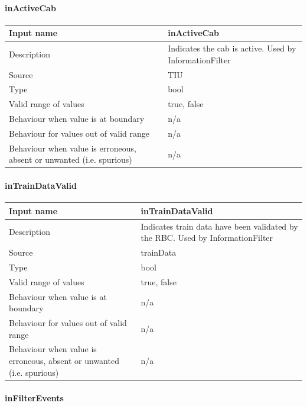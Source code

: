 \paragraph{inActiveCab}

\begin{longtable}{p{}p{}}
\toprule
Input name				& inActiveCab \\
\midrule
Description				& Indicates the cab is active. Used by InformationFilter \\
\midrule
Source					& TIU\\ 
\midrule
Type					& bool\\
\midrule
Valid range of values	& true, false\\
\midrule
Behaviour when value is at boundary	& n/a\\
\midrule
Behaviour for values out of valid range	& n/a\\
\midrule
Behaviour when value is erroneous, absent or unwanted (i.e. spurious) & n/a\\
\bottomrule
\end{longtable}

\paragraph{inTrainDataValid}

\begin{longtable}{p{}p{}}
\toprule
Input name				& inTrainDataValid \\
\midrule
Description				& Indicates train data have been validated by the RBC. Used by InformationFilter \\
\midrule
Source					& trainData\\ 
\midrule
Type					& bool\\
\midrule
Valid range of values	& true, false\\
\midrule
Behaviour when value is at boundary	& n/a\\
\midrule
Behaviour for values out of valid range	& n/a\\
\midrule
Behaviour when value is erroneous, absent or unwanted (i.e. spurious) & n/a\\
\bottomrule
\end{longtable}

\paragraph{inFilterEvents}

